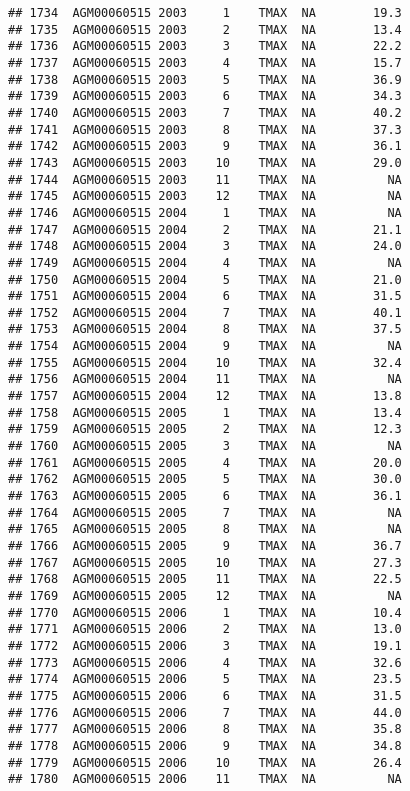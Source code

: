 \documentclass{article}\usepackage[]{graphicx}\usepackage[]{color}
\makeatletter
\newenvironment{kframe}{%
 \def\at@end@of@kframe{}%
 \ifinner\ifhmode%
  \def\at@end@of@kframe{\end{minipage}}%
  \begin{minipage}{\columnwidth}%
 \fi\fi%
 \def\FrameCommand##1{\hskip\@totalleftmargin \hskip-\fboxsep
 \colorbox{shadecolor}{##1}\hskip-\fboxsep
     \hskip-\linewidth \hskip-\@totalleftmargin \hskip\columnwidth}%
 \MakeFramed {\advance\hsize-\width
   \@totalleftmargin\z@ \linewidth\hsize
   \@setminipage}}%
 {\par\unskip\endMakeFramed%
 \at@end@of@kframe}
\newenvironment{knitrout}{}{} %
\makeatother
\begin{document}
\begin{knitrout}
\begin{kframe}
\begin{verbatim}
## 1734  AGM00060515 2003     1    TMAX  NA        19.3
## 1735  AGM00060515 2003     2    TMAX  NA        13.4
## 1736  AGM00060515 2003     3    TMAX  NA        22.2
## 1737  AGM00060515 2003     4    TMAX  NA        15.7
## 1738  AGM00060515 2003     5    TMAX  NA        36.9
## 1739  AGM00060515 2003     6    TMAX  NA        34.3
## 1740  AGM00060515 2003     7    TMAX  NA        40.2
## 1741  AGM00060515 2003     8    TMAX  NA        37.3
## 1742  AGM00060515 2003     9    TMAX  NA        36.1
## 1743  AGM00060515 2003    10    TMAX  NA        29.0
## 1744  AGM00060515 2003    11    TMAX  NA          NA
## 1745  AGM00060515 2003    12    TMAX  NA          NA
## 1746  AGM00060515 2004     1    TMAX  NA          NA
## 1747  AGM00060515 2004     2    TMAX  NA        21.1
## 1748  AGM00060515 2004     3    TMAX  NA        24.0
## 1749  AGM00060515 2004     4    TMAX  NA          NA
## 1750  AGM00060515 2004     5    TMAX  NA        21.0
## 1751  AGM00060515 2004     6    TMAX  NA        31.5
## 1752  AGM00060515 2004     7    TMAX  NA        40.1
## 1753  AGM00060515 2004     8    TMAX  NA        37.5
## 1754  AGM00060515 2004     9    TMAX  NA          NA
## 1755  AGM00060515 2004    10    TMAX  NA        32.4
## 1756  AGM00060515 2004    11    TMAX  NA          NA
## 1757  AGM00060515 2004    12    TMAX  NA        13.8
## 1758  AGM00060515 2005     1    TMAX  NA        13.4
## 1759  AGM00060515 2005     2    TMAX  NA        12.3
## 1760  AGM00060515 2005     3    TMAX  NA          NA
## 1761  AGM00060515 2005     4    TMAX  NA        20.0
## 1762  AGM00060515 2005     5    TMAX  NA        30.0
## 1763  AGM00060515 2005     6    TMAX  NA        36.1
## 1764  AGM00060515 2005     7    TMAX  NA          NA
## 1765  AGM00060515 2005     8    TMAX  NA          NA
## 1766  AGM00060515 2005     9    TMAX  NA        36.7
## 1767  AGM00060515 2005    10    TMAX  NA        27.3
## 1768  AGM00060515 2005    11    TMAX  NA        22.5
## 1769  AGM00060515 2005    12    TMAX  NA          NA
## 1770  AGM00060515 2006     1    TMAX  NA        10.4
## 1771  AGM00060515 2006     2    TMAX  NA        13.0
## 1772  AGM00060515 2006     3    TMAX  NA        19.1
## 1773  AGM00060515 2006     4    TMAX  NA        32.6
## 1774  AGM00060515 2006     5    TMAX  NA        23.5
## 1775  AGM00060515 2006     6    TMAX  NA        31.5
## 1776  AGM00060515 2006     7    TMAX  NA        44.0
## 1777  AGM00060515 2006     8    TMAX  NA        35.8
## 1778  AGM00060515 2006     9    TMAX  NA        34.8
## 1779  AGM00060515 2006    10    TMAX  NA        26.4
## 1780  AGM00060515 2006    11    TMAX  NA          NA

\end{verbatim}
\end{kframe}
\end{knitrout}
\end{document}
